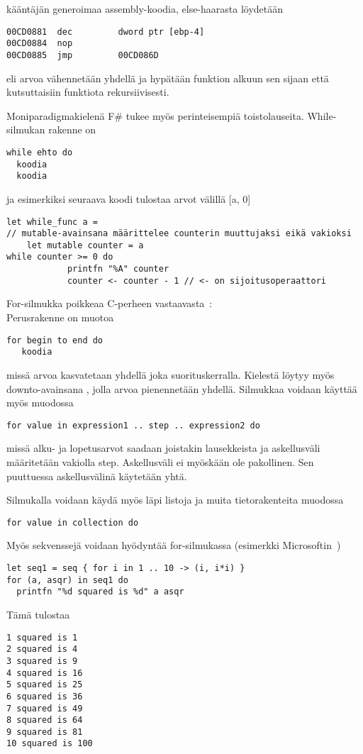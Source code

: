 kääntäjän generoimaa assembly-koodia, else-haarasta löydetään

\begin{lstlisting}
00CD0881  dec         dword ptr [ebp-4]  
00CD0884  nop  
00CD0885  jmp         00CD086D
\end{lstlisting}

eli arvoa vähennetään yhdellä ja hypätään funktion alkuun sen sijaan että kutsuttaisiin funktiota rekursiivisesti.
\par
Moniparadigmakielenä F\# tukee myös perinteisempiä toistolauseita. While-silmukan rakenne on

\begin{lstlisting}
while ehto do
  koodia
  koodia
\end{lstlisting}

ja esimerkiksi seuraava koodi tulostaa arvot välillä [a, 0]

\begin{lstlisting}
let while_func a =
// mutable-avainsana määrittelee counterin muuttujaksi eikä vakioksi
    let mutable counter = a     
while counter >= 0 do
            printfn "%A" counter
            counter <- counter - 1 // <- on sijoitusoperaattori
\end{lstlisting}

For-silmukka poikkeaa C-perheen vastaavasta~\cite{msn_loops}:
\\
Perusrakenne on muotoa

\begin{lstlisting}
for begin to end do  
   koodia
\end{lstlisting}

missä arvoa kasvatetaan yhdellä joka suorituskerralla. Kielestä löytyy myös downto-avainsana , jolla arvoa pienennetään yhdellä. Silmukkaa voidaan käyttää myös muodossa

\begin{lstlisting}
for value in expression1 .. step .. expression2 do
\end{lstlisting}

missä alku- ja lopetusarvot saadaan joistakin lausekkeista ja askellusväli määritetään vakiolla step. Askellusväli ei myöskään ole pakollinen. Sen puuttuessa askellusvälinä käytetään yhtä.
\par
Silmukalla voidaan käydä myös läpi listoja ja muita tietorakenteita muodossa

\begin{lstlisting}
for value in collection do
\end{lstlisting} 
 
Myös sekvenssejä voidaan hyödyntää for-silmukassa (esimerkki Microsoftin~\cite{msn_loops})

\begin{lstlisting}
let seq1 = seq { for i in 1 .. 10 -> (i, i*i) }
for (a, asqr) in seq1 do
  printfn "%d squared is %d" a asqr
\end{lstlisting}

Tämä tulostaa
\\
\begin{lstlisting}
1 squared is 1
2 squared is 4
3 squared is 9
4 squared is 16
5 squared is 25
6 squared is 36
7 squared is 49
8 squared is 64
9 squared is 81
10 squared is 100  
\end{lstlisting}